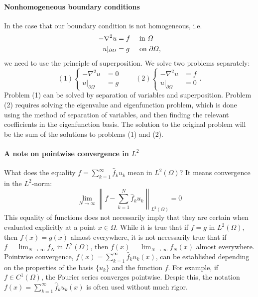 \paragraph{Nonhomogeneous boundary conditions} In the case that our boundary condition is not homogeneous, i.e. 
\begin{equation}
    \begin{aligned}
        -\nabla^2 u&=f&&\text{ in }\Omega\\ 
        u|_{\partial\Omega}&=g&&\text{ on }\partial\Omega,
    \end{aligned}
\end{equation}
we need to use the principle of superposition. We solve two problems separately: 
\begin{equation*}
    (1)\left\{\begin{aligned}-\nabla^{2}u&=0\\ u|_{\partial\Omega}&=g\end{aligned}\right.\qquad (2)\left\{\begin{aligned}-\nabla^{2}u&=f\\ u|_{\partial\Omega}&=0\end{aligned}\right. .
\end{equation*}
Problem (1) can be solved by separation of variables and superposition. Problem (2) requires solving the eigenvalue and eigenfunction problem, which is done using the method of separation of variables, and then finding the relevant coefficients in the eigenfunction basis. The solution to the original problem will be the sum of the solutions to problems (1) and (2).

\paragraph{A note on pointwise convergence in $L^2$} What does the equality $f=\sum_{k=1}^{\infty}\hat{f}_{k}u_{k}$ mean in $L^{2}(\Omega)$?  It means convergence in the $L^2$-norm:
\begin{equation*}
    \lim_{N\rightarrow\infty}\left\|f-\sum_{k=1}^{N}\hat{f}_{k}u_{k}\right\|_{L^{2}(\Omega)}=0
\end{equation*}
This equality of functions does not necessarily imply that they are certain when evaluated explicitly at a point $x\in\Omega$. While it is true that if $f=g$ in $L^{2}(\Omega)$, then $f(x)=g(x)$ almost everywhere, it is not necessarily true that if $f=\lim_{N\rightarrow\infty}f_{N}$ in $L^{2}(\Omega)$, then $f(x)=\lim_{N\rightarrow\infty}f_{N}(x)$ almost everywhere. Pointwise convergence, $f(x)=\sum_{k=1}^{\infty}\hat{f}_{k}u_{k}(x)$, can be established depending on the properties of the basis $\{u_k\}$ and the function $f$. For example, if $f\in C^{1}(\Omega)$, the Fourier series converges pointwise. Despie this, the notation $f(x)=\sum_{k=1}^{\infty}\hat{f}_{k}u_{k}(x)$ is often used without much rigor.

